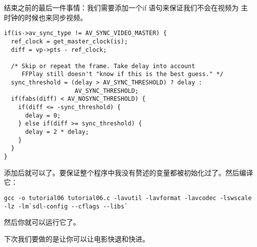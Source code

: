 结束之前的最后一件事情：我们需要添加一个if 语句来保证我们不会在视频为
主时钟的时候也来同步视频。
\begin{lstlisting}
if(is->av_sync_type != AV_SYNC_VIDEO_MASTER) {
  ref_clock = get_master_clock(is);
  diff = vp->pts - ref_clock;

  /* Skip or repeat the frame. Take delay into account
     FFPlay still doesn't "know if this is the best guess." */
  sync_threshold = (delay > AV_SYNC_THRESHOLD) ? delay :
                    AV_SYNC_THRESHOLD;
  if(fabs(diff) < AV_NOSYNC_THRESHOLD) {
    if(diff <= -sync_threshold) {
      delay = 0;
    } else if(diff >= sync_threshold) {
      delay = 2 * delay;
    }
  }
}
\end{lstlisting}

添加后就可以了。要保证整个程序中我没有赘述的变量都被初始化过了。然后编译它：
\begin{lstlisting}
gcc -o tutorial06 tutorial06.c -lavutil -lavformat -lavcodec -lswscale -lz -lm`sdl-config --cflags --libs`
\end{lstlisting}
然后你就可以运行它了。

下次我们要做的是让你可以让电影快退和快进。
